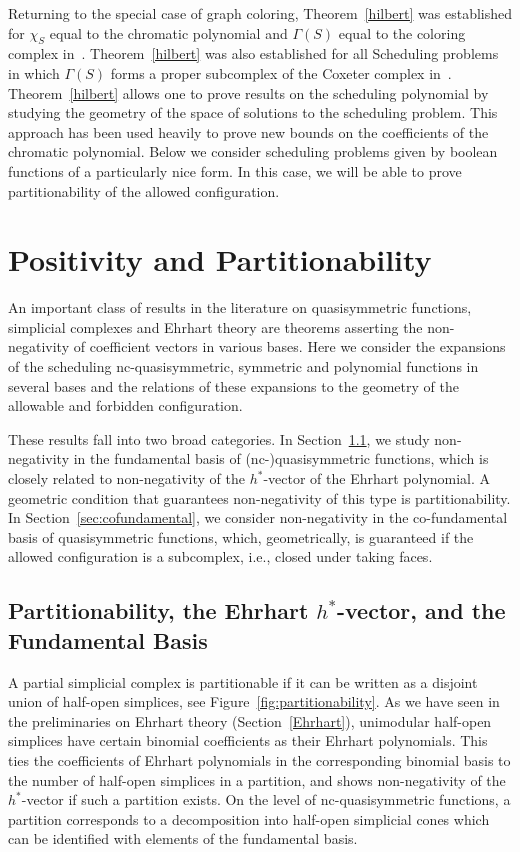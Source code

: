 \documentclass[12pt,reqno]{amsart}
\numberwithin{definition}{section}
\theoremstyle{definition}
\newcommand{\forb}{\Gamma} %
\begin{document}
Returning to the special case of graph coloring, Theorem~\ref{hilbert}
was established for $\chi_S$ equal to the chromatic polynomial and
$\forb(S)$ equal to the coloring complex in~\cite{Ein}.
Theorem~\ref{hilbert} was also established for all Scheduling problems
in which $\forb(S)$ forms a proper subcomplex of the Coxeter complex
in~\cite{ABK}.  Theorem~\ref{hilbert} allows one to prove results on
the scheduling polynomial by studying the geometry of the space of
solutions to the scheduling problem.  This approach has been used
heavily to prove new bounds on the coefficients of the chromatic
polynomial.   Below we consider scheduling problems given by boolean functions
of a particularly nice form.  In this case, we will be able to prove partitionability of the allowed configuration.



\section{Positivity and Partitionability}
\label{geometry}

An important class of results in the literature on quasisymmetric
functions, simplicial complexes and Ehrhart theory are theorems
asserting the non-negativity of coefficient vectors in various bases.
Here we consider the expansions of the scheduling nc-quasisymmetric,
symmetric and polynomial functions in several bases and the relations
of these expansions to the geometry of the allowable and forbidden configuration.  

These results fall into two broad categories. In Section~\ref{sec:partitionability}, we study non-negativity in the fundamental basis of (nc-)quasisymmetric functions, which is closely related to non-negativity of the $h^*$-vector of the Ehrhart polynomial. A geometric condition that guarantees non-negativity of this type is partitionability. In Section~\ref{sec:cofundamental}, we consider non-negativity in the co-fundamental basis of quasisymmetric functions, which, geometrically, is guaranteed if the allowed configuration is a subcomplex, i.e., closed under taking faces.

\subsection{Partitionability, the Ehrhart $h^*$-vector, and the Fundamental Basis}
\label{sec:partitionability}

A partial simplicial complex is partitionable if it can be written as a disjoint union of half-open simplices, see Figure~\ref{fig:partitionability}. As we have seen in the preliminaries on Ehrhart theory (Section~\ref{Ehrhart}), unimodular half-open simplices have certain binomial coefficients as their Ehrhart polynomials. This ties the coefficients of Ehrhart polynomials in the corresponding binomial basis to the number of half-open simplices in a partition, and shows non-negativity of the $h^*$-vector if such a partition exists. On the level of nc-quasisymmetric functions, a partition corresponds to a decomposition into half-open simplicial cones which can be identified with elements of the fundamental basis.
\end{document}
